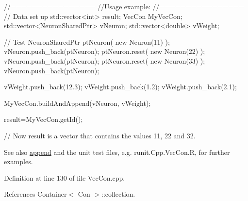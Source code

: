\begin{DoxyCode}
        //================
        //Usage example:
        //================
        // Data set up
                std::vector<int> result;
                VecCon MyVecCon;
                std::vector<NeuronSharedPtr> vNeuron;
                std::vector<double> vWeight;


        // Test
                NeuronSharedPtr ptNeuron( new Neuron(11) );
                vNeuron.push_back(ptNeuron);
                ptNeuron.reset( new Neuron(22) );
                vNeuron.push_back(ptNeuron);
                ptNeuron.reset( new Neuron(33) );
                vNeuron.push_back(ptNeuron);

                vWeight.push_back(12.3);
                vWeight.push_back(1.2);
                vWeight.push_back(2.1);

                MyVecCon.buildAndAppend(vNeuron, vWeight);

                result=MyVecCon.getId();

        // Now result is a vector that contains the values 11, 22 and 32.
\end{DoxyCode}


\begin{DoxySeeAlso}{See also}
\hyperlink{classvec_a_m_o_r_e_ab060ffa67e85997fc4236bedfd2f17b6}{append} and the unit test files, e.g. runit.Cpp.VecCon.R, for further examples. 
\end{DoxySeeAlso}


Definition at line 130 of file VecCon.cpp.



References Container$<$ Con $>$::collection.


